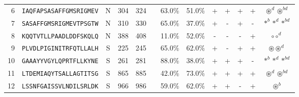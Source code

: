 \begin{tabular}{rcccccccccccc}
6  &  \texttt{IAQFAPSASAFFGMSRIGMEV} &       N &    304 &   324 &                                                                  &                          63.0\% &                           51.0\% &          + &           + &          + &           + &                                                                                                 $ \circledast^d \circledast^{bd} $ \\
7  &  \texttt{SASAFFGMSRIGMEVTPSGTW} &       N &    310 &   330 &                                                                  &                          65.0\% &                           37.0\% &          + &           - &          + &           - &                                                                                                        $ \ast^b \ast^d \ast^{bd} $ \\
8  &  \texttt{KQQTVTLLPAADLDDFSKQLQ} &       N &    388 &   408 &                                                                  &                          11.0\% &                           52.0\% &          - &           - &          - &           + &                                                                                                                  $ \circ \circ^d $ \\
9  &  \texttt{PLVDLPIGINITRFQTLLALH} &       S &    225 &   245 &                                                                  &                          65.0\% &                           62.0\% &          + &           - &          + &           + &                                                                                                      $ \circledast \circledast^d $ \\
10 &  \texttt{GAAAYYVGYLQPRTFLLKYNE} &       S &    261 &   281 &                                                                  &                          88.0\% &                           38.0\% &          + &           + &          + &           - &                                                                                                        $ \ast^b \ast^d \ast^{bd} $ \\
11 &  \texttt{LTDEMIAQYTSALLAGTITSG} &       S &    865 &   885 &                                                                  &                          42.0\% &                           73.0\% &          + &           + &          + &           + &                                                                                                 $ \circledast^d \circledast^{bd} $ \\
12 &  \texttt{LSSNFGAISSVLNDILSRLDK} &       S &    966 &   986 &                                                                  &                          59.0\% &                           62.0\% &          + &           + &          - &           + &                                                                                                                  $ \circledast^b $ \\

\end{tabular}
